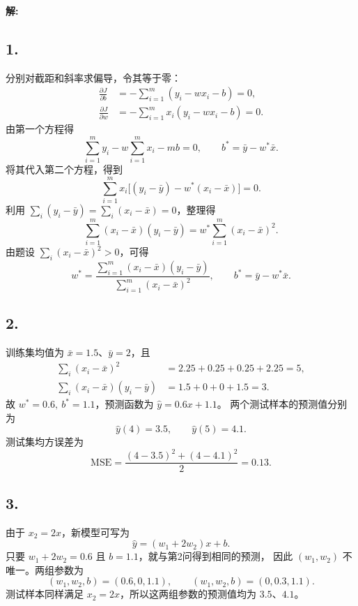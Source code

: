 \documentclass[10pt]{article}
\begin{document}
\textbf{\large 解:}

\subsection*{1.}
分别对截距和斜率求偏导，令其等于零：
\begin{align*}
\frac{\partial J}{\partial b}
&=-\sum_{i=1}^{m}(y_i-wx_i-b)=0,\\
\frac{\partial J}{\partial w}
&=-\sum_{i=1}^{m}x_i(y_i-wx_i-b)=0.
\end{align*}
由第一个方程得
\[
\sum_{i=1}^{m}y_i-w\sum_{i=1}^{m}x_i-mb=0,
\qquad {b^*=\bar y-w^*\bar x}.
\]
将其代入第二个方程，得到
\[
\sum_{i=1}^{m}x_i\bigl[(y_i-\bar y)-w^*(x_i-\bar x)\bigr]=0.
\]
利用 $\sum_i(y_i-\bar y)=\sum_i(x_i-\bar x)=0$，整理得
\[
\sum_{i=1}^{m}(x_i-\bar x)(y_i-\bar y)
=w^*\sum_{i=1}^{m}(x_i-\bar x)^2.
\]
由题设 $\sum_i(x_i-\bar x)^2>0$，可得
\[
{w^*=\frac{\sum_{i=1}^{m}(x_i-\bar x)(y_i-\bar y)}
{\sum_{i=1}^{m}(x_i-\bar x)^2}},\qquad
{b^*=\bar y-w^*\bar x}.
\]

\subsection*{2.}
训练集均值为 $\bar x=1.5$、$\bar y=2$，且
\begin{align*}
\sum_i(x_i-\bar x)^2&=2.25+0.25+0.25+2.25=5,\\
\sum_i(x_i-\bar x)(y_i-\bar y)&=1.5+0+0+1.5=3.
\end{align*}
故 ${w^*=0.6,\ b^*=1.1}$，预测函数为 $\hat y=0.6x+1.1$。
两个测试样本的预测值分别为
\[
\hat y(4)=3.5,\qquad \hat y(5)=4.1.
\]
测试集均方误差为
\[
{\mathrm{MSE}=\frac{(4-3.5)^2+(4-4.1)^2}{2}=0.13}.
\]

\subsection*{3.}
由于 $x_2=2x$，新模型可写为
\[
\hat y=(w_1+2w_2)x+b.
\]
只要 $w_1+2w_2=0.6$ 且 $b=1.1$，就与第2问得到相同的预测，
因此 $(w_1,w_2)$ 不唯一。两组参数为
\[
{(w_1,w_2,b)=(0.6,0,1.1)},\qquad
{(w_1,w_2,b)=(0,0.3,1.1)}.
\]
测试样本同样满足 $x_2=2x$，所以这两组参数的预测值均为 $3.5$、$4.1$。
\end{document}

